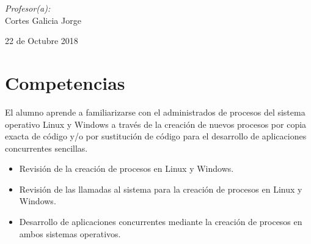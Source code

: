 \documentclass[12pt]{article}
\begin{document}
\begin{titlepage}
\begin{center}
\begin{minipage}{0.5\textwidth}
\begin{flushleft}
\begin{tabular}{ll}
                         
                    \end{tabular}
                    \end{flushleft}
                \end{minipage}%
                \begin{minipage}{0.5\textwidth}
                    \begin{flushright} \large
                        \emph{Profesor(a):} \\
                        Cortes Galicia Jorge  \\
                    \end{flushright}
                \end{minipage}
                
                \vfill
                
                {\large 22 de Octubre 2018}
            \end{center}
        \end{titlepage}
    
    \tableofcontents
    \newpage


    \section{Competencias}
    El alumno aprende a familiarizarse con el administrados de procesos del sistema operativo Linux y Windows a través de la creación de nuevos procesos por copia exacta de código y/o por sustitución de código para el desarrollo de aplicaciones concurrentes sencillas.
    \begin{itemize}
        \item[\Checkmark] Revisión de la creación de procesos en Linux y Windows.

        \item[\Checkmark] Revisión de las llamadas al sistema para la creación de procesos en Linux y Windows.

        \item[\Checkmark] Desarrollo de aplicaciones concurrentes mediante la creación de procesos en ambos sistemas operativos.
    \end{itemize}
    
\end{document}
